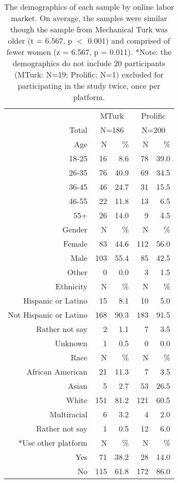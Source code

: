 \documentclass[a4paper,notitlepage,12pt]{article}
\begin{document}
\begin{table}
\centering
\setlength{\tabcolsep}{15pt}
\begin{tabular}{ rrrrr }
\toprule
& \multicolumn{2}{c}{MTurk} & \multicolumn{2}{c}{Prolific} \\
\cmidrule(lr){2-3} \cmidrule(lr){4-5}
Total & \multicolumn{2}{c}{N=186} & \multicolumn{2}{c}{N=200} \\
\midrule
Age & N & \% & N & \% \\
\cmidrule(lr){1-5}
18-25   &      16 &   8.6 &       78 &  39.0 \\
26-35   &      76 &  40.9 &       69 &  34.5 \\
36-45   &      46 &  24.7 &       31 &  15.5 \\
46-55   &      22 &  11.8 &       13 &   6.5 \\
55+     &      26 &  14.0 &        9 &   4.5 \\
\midrule
Gender & N & \% & N & \% \\
\cmidrule(lr){1-5}
Female             &    83 &  44.6 &    112 &  56.0 \\
Male               &   103 &  55.4 &     85 &  42.5 \\
Other              &     0 &   0.0 &      3 &   1.5 \\
\midrule
Ethnicity & N & \% & N & \% \\
\cmidrule(lr){1-5}
Hispanic or Latino     &    15 &   8.1 &     10 &   5.0 \\
Not Hispanic or Latino &   168 &  90.3 &    183 &  91.5 \\
Rather not say         &     2 &   1.1 &      7 &   3.5 \\
Unknown                &     1 &   0.5 &      0 &   0.0 \\
\midrule
Race & N & \% & N & \% \\
\cmidrule(lr){1-5}
African American                 &    21 &  11.3 &      7 &   3.5 \\
Asian                                     &     5 &   2.7 &     53 &  26.5 \\
White                                     &   151 &  81.2 &    121 &  60.5 \\
Multiracial                               &     6 &   3.2 &      4 &   2.0 \\
Rather not say                            &     1 &   0.5 &     12 &   6.0 \\
\midrule
*Use other platform & N & \% & N & \% \\
\cmidrule(lr){1-5}
Yes            &      71 &  38.2 &       28 &  14.0 \\
No             &     115 &  61.8 &      172 &  86.0 \\
\bottomrule
\end{tabular}
\caption{The demographics of each sample by online labor market. On average, the samples were similar though the sample from Mechanical Turk was older (t = 6.567, p $<$ 0.001) and comprised of fewer women (z = 6.567, p = 0.011). *Note: the demographics do not include 20 participants (MTurk: N=19; Prolific: N=1) excluded for participating in the study twice, once per platform.}
\label{tab:demographics}
\end{table}

% 
\end{document}
